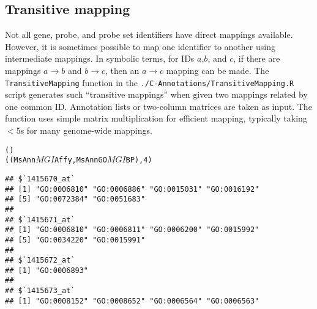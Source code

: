 \begin{table}[h]
  \begin{center}
    \caption{Annotation scripts and variables for Hgu133 Plus 2.0 chip }\label{Ta:HSannotations}
  \end{center}
\end{table}

\subsection{Transitive mapping}
Not all gene, probe, and probe set identifiers have direct mappings
available. However, it is sometimes possible
to map one identifier to another using intermediate mappings.
In symbolic terms, for IDs $a$,$b$, and $c$, if there are mappings $a \rightarrow b$
and $b \rightarrow c$, then an $a \rightarrow c$ mapping can be made. The
\texttt{TransitiveMapping} function in the \texttt{./C-Annotations/TransitiveMapping.R}
script generates such ``transitive mappings'' when given two mappings
related by one common ID. Annotation lists or two-column
matrices are taken as input. The function uses simple matrix multiplication for
efficient mapping, typically taking $<$5s for many genome-wide mappings.

\begin{knitrout}
\color{fgcolor}\begin{kframe}
\begin{alltt}
()
((MsAnn$MGI$Affy, MsAnnGO$MGI$BP), 4)
\end{alltt}
\begin{verbatim}
## $`1415670_at`
## [1] "GO:0006810" "GO:0006886" "GO:0015031" "GO:0016192" 
## [5] "GO:0072384" "GO:0051683"
## 
## $`1415671_at`
## [1] "GO:0006810" "GO:0006811" "GO:0006200" "GO:0015992" 
## [5] "GO:0034220" "GO:0015991"
## 
## $`1415672_at`
## [1] "GO:0006893"
## 
## $`1415673_at`
## [1] "GO:0008152" "GO:0008652" "GO:0006564" "GO:0006563"
\end{verbatim}
\end{kframe}
\end{knitrout}


